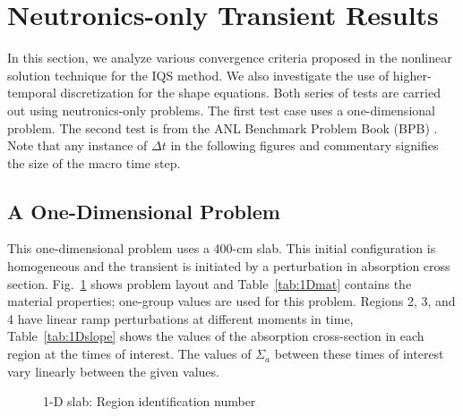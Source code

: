 \documentclass{elsarticle}
\newcommand{\fig}[1]{Fig.~\ref{#1}}                      %
\newcommand{\tbl}[1]{Table~\ref{#1}}                     %
\begin{document}
\section{Neutronics-only Transient Results}

In this section, we analyze various convergence criteria proposed in the nonlinear solution technique for the IQS method. We also investigate the use of higher-temporal discretization for the shape equations. Both series of tests are carried out using neutronics-only problems.  The first test case uses a one-dimensional problem. The second test is from the ANL Benchmark Problem Book (BPB) \cite{ANL_BPB}. Note that any instance of $\Delta t$ in the following figures and commentary signifies the size of the macro time step.

\subsection{A One-Dimensional Problem}

This one-dimensional problem uses a 400-cm slab. This initial configuration is homogeneous and the transient is initiated by a perturbation in absorption cross section. \fig{fig:slab} shows problem layout and \tbl{tab:1Dmat} contains the material properties; one-group values are used for this problem. Regions 2, 3, and 4 have linear ramp perturbations at different moments in time, \tbl{tab:1Dslope} shows the values of the absorption cross-section in each region at the times of interest.  The values of $\Sigma_a$ between these times of interest vary linearly between the given values.

\begin{figure}[!htbp]
\begin{center}
\caption{1-D slab: Region identification number}
\label{fig:slab}
\end{center}
\end{figure}
\end{document}
